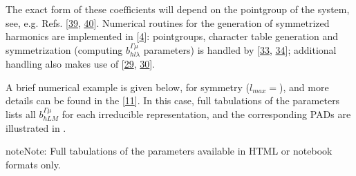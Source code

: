 \documentclass[letterpaper,table,10pt,english]{jupyterBook}
\begin{document}
\sphinxAtStartPar
The exact form of these coefficients will depend on the point\sphinxhyphen{}group of the system, see, e.g. Refs. {[}\hyperlink{cite.backmatter/bibliography:id496}{39}, \hyperlink{cite.backmatter/bibliography:id752}{40}{]}. Numerical routines for the generation of symmetrized harmonics are implemented in  {[}\hyperlink{cite.backmatter/bibliography:id618}{4}{]}: point\sphinxhyphen{}groups, character table generation and symmetrization (computing \(b_{hl\lambda}^{\Gamma\mu}\) parameters) is handled by  {[}\hyperlink{cite.backmatter/bibliography:id639}{33}, \hyperlink{cite.backmatter/bibliography:id640}{34}{]}; additional handling also makes use of  {[}\hyperlink{cite.backmatter/bibliography:id858}{29}, \hyperlink{cite.backmatter/bibliography:id796}{30}{]}.

\sphinxAtStartPar
A brief numerical example is given below, for  symmetry (\(l_{max}=\)), and more details can be found in the  {[}\hyperlink{cite.backmatter/bibliography:id617}{11}{]}. In this case, full tabulations of the parameters lists all \(b_{hLM}^{\Gamma\mu}\) for each irreducible representation, and the corresponding PADs are illustrated in .

\begin{sphinxShadowBox}
\sphinxstylesidebartitle{}

\begin{sphinxadmonition}{note}{Note:}
\sphinxAtStartPar
Full tabulations of the parameters available in HTML or notebook formats only.
\end{sphinxadmonition}
\end{sphinxShadowBox}
\end{document}
